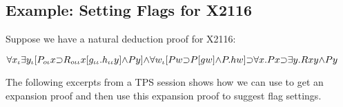 \subsection{Example: Setting Flags for X2116}\label{X2116-NAT-ETREE}

Suppose we have a natural deduction proof for X2116:

$\forall x _{\iota}   \exists y _{\iota}  [P _{o\iota}  x \mathord{\supset} R _{o\iota\iota}  x [g _{\iota\iota}  .h _{\iota\iota}  y] \mathord{\wedge} P y] \mathord{\wedge}  \forall w _{\iota}  [P w \mathord{\supset} P [g w] \mathord{\wedge} P .h w]
 \mathord{\supset}  \forall x .P x \mathord{\supset}  \exists y .R x y \mathord{\wedge} P y$

The following excerpts from a TPS session shows how we can
use  to get an expansion proof
and then use this expansion proof to suggest flag settings.


